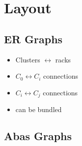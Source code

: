 \section{Layout}

\subsection{ER Graphs}
    \begin{itemize}
        \item Clusters $\leftrightarrow$ racks
        \item $C_0 \leftrightarrow C_i$ connections
        \item $C_i \leftrightarrow C_j$ connections
        \item can be bundled
    \end{itemize}

\subsection{Abas Graphs}
